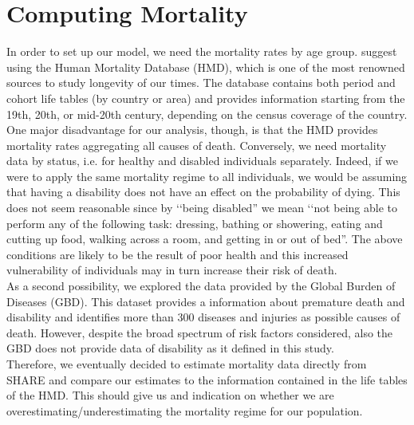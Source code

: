 



\section{Computing Mortality}

In order to set up our model, we need the mortality rates by age group. \cite{Caswell2018} suggest using the Human Mortality Database (HMD), which is one of the most renowned sources to study longevity of our times.
The database contains both period and cohort life tables (by country or area) and provides information starting from the 19th, 20th, or mid-20th century, depending on the census coverage of the country. \\

One major disadvantage for our analysis, though, is that the HMD provides mortality rates aggregating all causes of death. Conversely, we need mortality data by status, i.e. for healthy and disabled individuals separately. Indeed, if we were to apply the same mortality regime to all individuals, we would be assuming that having a disability does not have an effect on the probability of dying. This does not seem reasonable since by \lq\lq being disabled'' we mean \lq\lq not being able to perform any of the following task: dressing, bathing or showering, eating and cutting up food, walking across a room, and getting in or out of bed''. The above conditions are likely to be the result of poor health and this increased vulnerability of individuals may in turn increase their risk of death.\\

As a second possibility, we explored the data provided by the Global Burden of Diseases (GBD). 
This dataset provides a information about premature death and disability and identifies more than 300 diseases and injuries as possible causes of death. However, despite the broad spectrum of risk factors considered, also the GBD does not provide data of disability as it defined in this study.\\

Therefore, we eventually decided to estimate mortality data directly from SHARE and compare our estimates to the information contained in the life tables of the HMD. This should give us and indication on whether we are overestimating/underestimating the mortality regime for our population.



